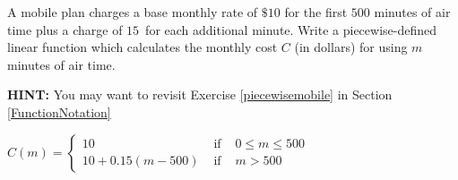 { A mobile plan charges a base monthly rate of $\$10$ for the first $500$ minutes of air time plus a charge of $15$\textcent \, for each additional minute.  Write a piecewise-defined linear function which calculates the monthly cost $C$ (in dollars) for using $m$ minutes of air time. 

\textbf{HINT:}  You may want to revisit Exercise \ref{piecewisemobile} in Section \ref{FunctionNotation}}
{${\displaystyle C(m) = \left\{ \begin{array}{rcl} 10 & \mbox{ if } & 0 \leq m \leq 500 \\
                                                            10+0.15(m-500) & \mbox{ if } & m > 500
                                     \end{array} \right. }$
}